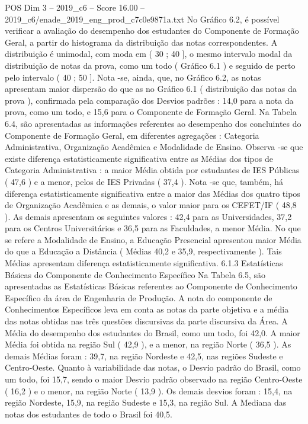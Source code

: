 \begin{textsample}{POS Dim 3 – 2019\_c6 – Score 16.00 – 2019\_c6/enade\_2019\_eng\_prod\_c7c0e9871a.txt}
No Gráfico 6.2, é possível verificar a avaliação do desempenho dos estudantes do Componente de Formação Geral, a partir do histograma da distribuição das notas correspondentes.
A distribuição é unimodal, com moda em ( 30 ; 40 ], o mesmo intervalo modal da distribuição de notas da prova, como um todo ( Gráfico 6.1 ) e seguido de perto pelo intervalo ( 40 ; 50 ].
Nota -se, ainda, que, no Gráfico 6.2, as notas apresentam maior dispersão do que as no Gráfico 6.1 ( distribuição das notas da prova ), confirmada pela comparação dos Desvios padrões : 14,0 para a nota da prova, como um todo, e 15,6 para o Componente de Formação Geral.
Na Tabela 6.4, são apresentadas as informações referentes ao desempenho dos concluintes do Componente de Formação Geral, em diferentes agregações : Categoria Administrativa, Organização Acadêmica e Modalidade de Ensino.
Observa -se que existe diferença estatisticamente significativa entre as Médias dos tipos de Categoria Administrativa : a maior Média obtida por estudantes de IES Públicas ( 47,6 ) e a menor, pelos de IES Privadas ( 37,4 ).
Nota -se que, também, há diferença estatisticamente significativa entre a maior das Médias dos quatro tipos de Organização Acadêmica e as demais, o valor maior para os CEFET/IF ( 48,8 ).
As demais apresentam os seguintes valores : 42,4 para as Universidades, 37,2 para os Centros Universitários e 36,5 para as Faculdades, a menor Média.
No que se refere a Modalidade de Ensino, a Educação Presencial apresentou maior Média do que a Educação a Distância ( Médias 40,2 e 35,9, respectivamente ).
Tais Médias apresentam diferença estatisticamente significativa. 6.1.3 Estatísticas Básicas do Componente de Conhecimento Específico Na Tabela 6.5, são apresentadas as Estatísticas Básicas referentes ao Componente de Conhecimento Específico da área de Engenharia de Produção.
A nota do componente de Conhecimentos Específicos leva em conta as notas da parte objetiva e a média das notas obtidas nas três questões discursivas da parte discursiva da Área.
A Média do desempenho dos estudantes do Brasil, como um todo, foi 42,0.
A maior Média foi obtida na região Sul ( 42,9 ), e a menor, na região Norte ( 36,5 ).
As demais Médias foram : 39,7, na região Nordeste e 42,5, nas regiões Sudeste e Centro-Oeste.
Quanto à variabilidade das notas, o Desvio padrão do Brasil, como um todo, foi 15,7, sendo o maior Desvio padrão observado na região Centro-Oeste ( 16,2 ) e o menor, na região Norte ( 13,9 ).
Os demais desvios foram : 15,4, na região Nordeste, 15,9, na região Sudeste e 15,3, na região Sul.
A Mediana das notas dos estudantes de todo o Brasil foi 40,5.

\end{textsample}
